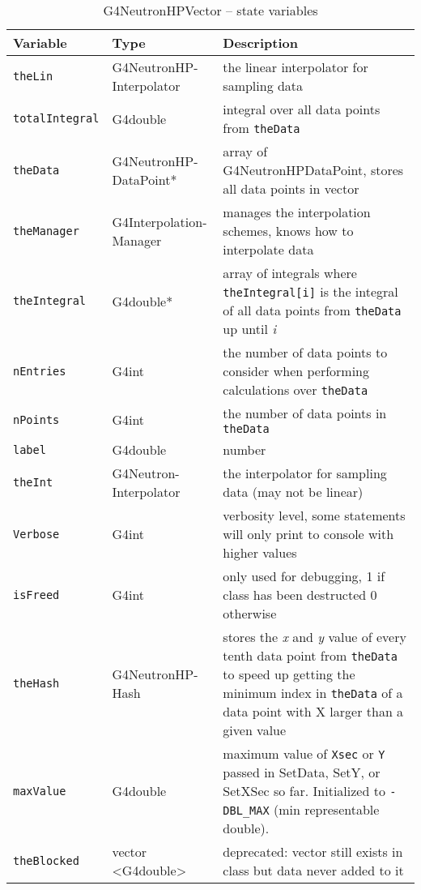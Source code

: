 \documentclass[12pt]{article}
\begin{document}
\begin{table}[h]
\caption{G4NeutronHPVector -- state variables}\label{Table_NeutronHPDataPointStateVariables}
\begin{tabularx}{\textwidth}{p{}p{}p{}}
\toprule
\bf Variable & \bf Type & \bf Description\\\midrule
\arrayrulecolor{lightgray}
\texttt{theLin} & G4NeutronHP-Interpolator & the linear interpolator for sampling data\\\hline
\texttt{totalIntegral} & G4double & integral over all data points from \texttt{theData}\\\hline
\texttt{theData} & G4NeutronHP-DataPoint* & array of G4NeutronHPDataPoint, stores all data points in vector\\\hline
\texttt{theManager} & G4Interpolation-Manager & manages the interpolation schemes, knows how to interpolate data\\\hline
\texttt{theIntegral} & G4double* & array of integrals where \texttt{theIntegral[i]} is the integral of all data points from \texttt{theData} up until \emph{i}\\\hline
\texttt{nEntries} & G4int & the number of data points to consider when performing calculations over \texttt{theData}\\\hline
\texttt{nPoints} & G4int & the number of data points in \texttt{theData} \\\hline
\texttt{label} & G4double & number \\\hline
\texttt{theInt} & G4Neutron-Interpolator & the interpolator for sampling data (may not be linear)\\\hline
\texttt{Verbose} & G4int & verbosity level, some statements will only print to console with higher values \\\hline
\texttt{isFreed} & G4int & only used for debugging, 1 if class has been destructed 0 otherwise\\\hline
\texttt{theHash} & G4NeutronHP-Hash & stores the \emph{x} and \emph{y} value of every tenth data point from \texttt{theData} to speed up getting the minimum index in \texttt{theData} of a data point with X larger than a given value \\\hline
\texttt{maxValue} & G4double & maximum value of \texttt{Xsec} or \texttt{Y} passed in SetData, SetY, or SetXSec so far. Initialized to \texttt{-DBL\_MAX} (min representable double).\\\hline
\texttt{theBlocked} & vector \textless G4double\textgreater & deprecated: vector still exists in class but data never added to it\\\hline

\end{tabularx}
\end{table}
\end{document}
